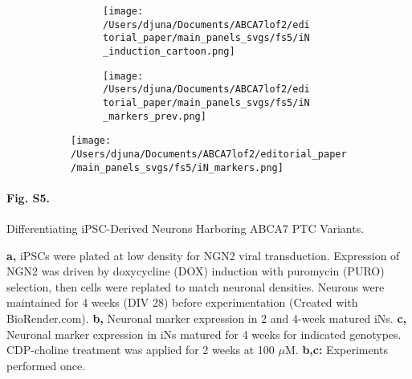% 
% 
\begin{figure}[H]
    \begin{subfigure}[t]{\textwidth}
        \begin{subfigure}[t]{0.45\textwidth}
            \caption{}
            \texttt{[image: /Users/djuna/Documents/ABCA7lof2/editorial\_paper/main\_panels\_svgs/fs5/iN\_induction\_cartoon.png]}        
        \end{subfigure}
        \begin{subfigure}[t]{0.45\textwidth}
            \caption{}
            \texttt{[image: /Users/djuna/Documents/ABCA7lof2/editorial\_paper/main\_panels\_svgs/fs5/iN\_markers\_prev.png]}        
        \end{subfigure}
    \end{subfigure}
    \begin{subfigure}[t]{0.8\textwidth}
        \caption{}
        \hspace{2cm}
        \texttt{[image: /Users/djuna/Documents/ABCA7lof2/editorial\_paper/main\_panels\_svgs/fs5/iN\_markers.png]}        
    \end{subfigure}
\end{figure}
\paragraph*{Fig. S5.} Differentiating iPSC-Derived Neurons Harboring ABCA7 PTC Variants.
{}
\textbf{a,} iPSCs were plated at low density for NGN2 viral transduction. Expression of NGN2 was driven by doxycycline (DOX) induction with puromycin (PURO) selection, then cells were replated to match neuronal densities. Neurons were maintained for 4 weeks (DIV 28) before experimentation (Created with BioRender.com). 
\textbf{b,} Neuronal marker expression in 2 and 4-week matured iNs. 
\textbf{c,} Neuronal marker expression in iNs matured for 4 weeks for indicated genotypes. CDP-choline treatment was applied for 2 weeks at 100 $\mu$M. \textbf{b,c:} Experiments performed once.
%

